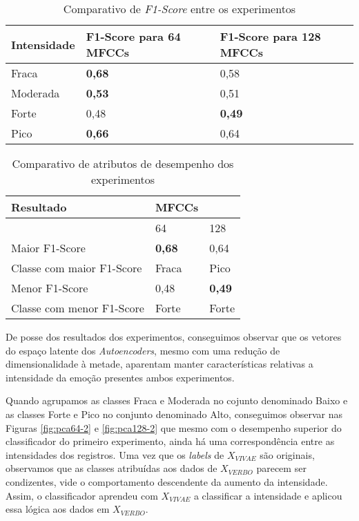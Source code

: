 {\begin{table}[]
    \centering
    \begin{tabular}{|l|l|l|}
    \hline
        Intensidade & F1-Score para 64 MFCCs & F1-Score para 128 MFCCs \\ \hline
        Fraca & \textbf{0,68} & 0,58 \\ \hline
        Moderada & \textbf{0,53} & 0,51 \\ \hline
        Forte & 0,48 & \textbf{0,49} \\ \hline
        Pico & \textbf{0,66} & 0,64 \\ \hline
    \end{tabular}
     \caption{\label{table:resultexp}Comparativo de \textit{F1-Score} entre os experimentos}
\end{table}

\begin{table}[]
    \centering
    \begin{tabular}{|l|l|l|}
    \hline
        Resultado & MFCCs & ~ \\ \hline
        ~ & 64 & 128 \\ \hline
        Maior F1-Score & \textbf{0,68} & 0,64 \\ \hline
        Classe com maior F1-Score & Fraca & Pico \\ \hline
        Menor F1-Score & 0,48 & \textbf{0,49} \\ \hline
        Classe com menor F1-Score & Forte & Forte \\ \hline
    \end{tabular}
    \caption{\label{table:compexp}Comparativo de atributos de desempenho dos experimentos}
\end{table}

De posse dos resultados dos experimentos, conseguimos observar que os vetores do espaço latente dos \textit{Autoencoders}, mesmo com uma redução de dimensionalidade à metade, aparentam manter características relativas a intensidade da emoção presentes ambos experimentos.

Quando agrupamos as classes Fraca e Moderada no cojunto denominado Baixo e as classes Forte e Pico no conjunto denominado Alto, conseguimos observar nas Figuras \ref{fig:pca64-2} e \ref{fig:pca128-2} que mesmo com o desempenho superior do classificador do primeiro experimento, ainda há uma correspondência entre as intensidades dos registros. Uma vez que os \textit{labels} de $X_{VIVAE}$ são originais, observamos que as classes atribuídas aos dados de $X_{VERBO}$ parecem ser condizentes, vide o comportamento descendente da aumento da intensidade. Assim, o classificador aprendeu com $X_{VIVAE}$ a classificar a intensidade e aplicou essa lógica aos dados em $X_{VERBO}$.

}
